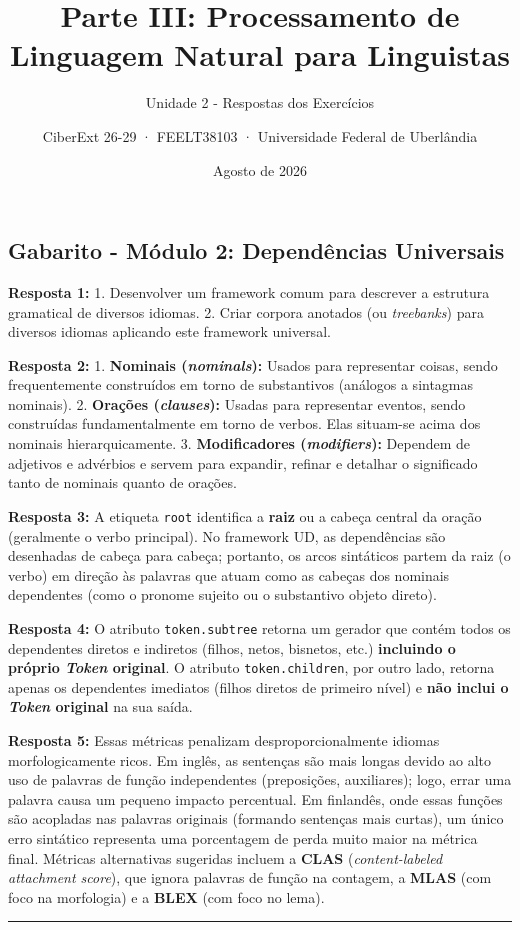 \documentclass[
  brazilian,
]{article}
\title{Parte III: Processamento de Linguagem Natural para Linguistas}
\subtitle{Unidade 2 - Respostas dos Exercícios}
\author{CiberExt 26-29 · FEELT38103 · Universidade Federal de
Uberlândia}
\date{Agosto de 2026}
\begin{document}
\maketitle

\hypertarget{gabarito---muxf3dulo-2-dependuxeancias-universais}{%
\subsection{Gabarito - Módulo 2: Dependências
Universais}\label{gabarito---muxf3dulo-2-dependuxeancias-universais}}

\textbf{Resposta 1:} 1. Desenvolver um framework comum para descrever a
estrutura gramatical de diversos idiomas. 2. Criar corpora anotados (ou
\emph{treebanks}) para diversos idiomas aplicando este framework
universal.

\textbf{Resposta 2:} 1. \textbf{Nominais (\emph{nominals}):} Usados para
representar coisas, sendo frequentemente construídos em torno de
substantivos (análogos a sintagmas nominais). 2. \textbf{Orações
(\emph{clauses}):} Usadas para representar eventos, sendo construídas
fundamentalmente em torno de verbos. Elas situam-se acima dos nominais
hierarquicamente. 3. \textbf{Modificadores (\emph{modifiers}):} Dependem
de adjetivos e advérbios e servem para expandir, refinar e detalhar o
significado tanto de nominais quanto de orações.

\textbf{Resposta 3:} A etiqueta \texttt{root} identifica a \textbf{raiz}
ou a cabeça central da oração (geralmente o verbo principal). No
framework UD, as dependências são desenhadas de cabeça para cabeça;
portanto, os arcos sintáticos partem da raiz (o verbo) em direção às
palavras que atuam como as cabeças dos nominais dependentes (como o
pronome sujeito ou o substantivo objeto direto).

\textbf{Resposta 4:} O atributo \texttt{token.subtree} retorna um
gerador que contém todos os dependentes diretos e indiretos (filhos,
netos, bisnetos, etc.) \textbf{incluindo o próprio \emph{Token}
original}. O atributo \texttt{token.children}, por outro lado, retorna
apenas os dependentes imediatos (filhos diretos de primeiro nível) e
\textbf{não inclui o \emph{Token} original} na sua saída.

\textbf{Resposta 5:} Essas métricas penalizam desproporcionalmente
idiomas morfologicamente ricos. Em inglês, as sentenças são mais longas
devido ao alto uso de palavras de função independentes (preposições,
auxiliares); logo, errar uma palavra causa um pequeno impacto
percentual. Em finlandês, onde essas funções são acopladas nas palavras
originais (formando sentenças mais curtas), um único erro sintático
representa uma porcentagem de perda muito maior na métrica final.
Métricas alternativas sugeridas incluem a \textbf{CLAS}
(\emph{content-labeled attachment score}), que ignora palavras de função
na contagem, a \textbf{MLAS} (com foco na morfologia) e a \textbf{BLEX}
(com foco no lema).

\begin{center}\rule{0.5\linewidth}{0.5pt}\end{center}
\end{document}
